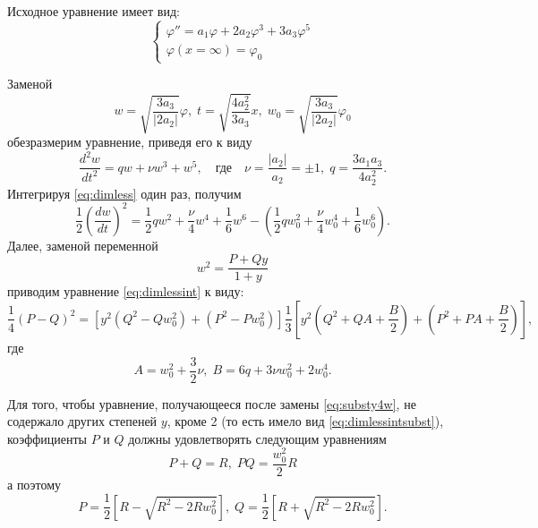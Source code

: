 Исходное уравнение имеет вид:
\begin{equation}\label{}
\begin{cases}
\varphi'' = a_1\varphi + 2a_2 \varphi^3 + 3a_3\varphi^5\\
\varphi(x=\infty) = \varphi_0
\end{cases}
\end{equation}

Заменой
\begin{equation}
w = \sqrt{\frac{3a_3}{|2a_2|}}\varphi,\;
t = \sqrt{\frac{4a_2^2}{3a_3}}x,\;
w_0 = \sqrt{\frac{3a_3}{|2a_2|}}\varphi_0
\end{equation}
обезразмерим уравнение, приведя его к виду
\begin{equation}\label{eq:dimless}
\frac{d^2 w}{dt^2} = qw + \nu w^3 + w^5,
\quad\text{где}\quad
\nu = \frac{|a_2|}{a_2} = \pm1,\; q = \frac{3a_1 a_3}{4a_2^2}.
\end{equation}
Интегрируя \eqref{eq:dimless} один раз, получим
\begin{equation}\label{eq:dimlessint}
\frac{1}{2}\left(\frac{dw}{dt}\right)^2 = 
\frac{1}{2}qw^2 + \frac{\nu}{4}w^4 + \frac{1}{6}w^6 - 
\left( \frac{1}{2}qw_0^2 + \frac{\nu}{4}w_0^4 + \frac{1}{6}w_0^6\right).
\end{equation}
Далее, заменой переменной
\begin{equation}\label{eq:substy4w}
w^2 = \frac{P+Qy}{1+y}
\end{equation}
приводим уравнение \eqref{eq:dimlessint} к виду:
\begin{equation}\label{eq:dimlessintsubst}
\frac{1}{4}(P-Q)^2 = 
\left[y^2(Q^2-Qw_0^2) + (P^2 - Pw_0^2)\right]
\frac{1}{3}\left[y^2(Q^2+QA+\frac{B}{2}) + 
(P^2 + PA +\frac{B}{2})\right],
\end{equation}
где
\begin{equation}
A = w_0^2 + \frac{3}{2}\nu, \; 
B = 6q + 3\nu w_0^2 + 2w_0^4.
\end{equation}

Для того, чтобы уравнение, получающееся после замены \eqref{eq:substy4w}, не содержало других степеней $y$, кроме 2 (то есть имело вид \eqref{eq:dimlessintsubst}), коэффициенты $P$ и $Q$ должны удовлетворять следующим уравнениям
\begin{equation}
P+Q = R, \; PQ = \frac{w_0^2}{2}R
\end{equation}
а поэтому
\begin{equation}
P = \frac{1}{2}\left[R - \sqrt{R^2 - 2Rw_0^2}\right], \;
Q = \frac{1}{2}\left[R + \sqrt{R^2 - 2Rw_0^2}\right].
\end{equation}

